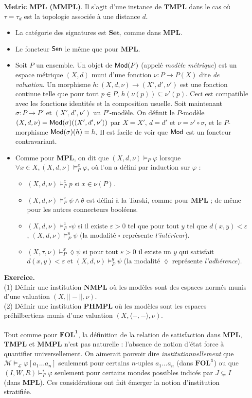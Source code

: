 \documentclass[11pt,a4paper]{article}
\newcommand{\La}{\mathcal{L}}
\newcommand{\M}{\mathcal{M}}
\newcommand{\ph}{\varphi}
\newcommand{\itemz}{\item[$\triangleright$]}
\newcommand{\gr}{\textbf}
\newcommand{\il}{\textit}
\newcommand{\info}[1]{\text{{\fontfamily{lmss}\selectfont #1}}}
\newcommand{\Mod}{\info{Mod}}
\newcommand{\Sen}{\info{Sen}}
\newcommand{\1}{\mathbbm{1}}
\begin{document}
\gr{Metric MPL (MMPL)}. Il s'agit d'une instance de $\gr{TMPL}$ dans le cas où $\tau = \tau_d$ est la topologie associée à une distance $d$.
\begin{itemize}
\itemz La catégorie des signatures est $\gr{Set}$, comme dans $\gr{MPL}$.
\itemz Le foncteur $\Sen$ le même que pour $\gr{MPL}$.
\itemz Soit $P$ un ensemble. Un objet de $\Mod(P)$ (appelé \il{modèle métrique}) est un espace métrique $(X,d)$ muni d'une fonction $\nu : P \to P(X)$ dite \il{de valuation}. Un morphisme $h : (X,d,\nu) \to (X',d',\nu')$ est une fonction continue telle que pour tout $p \in P$, $h(\nu(p)) \subseteq \nu'(p)$. Ceci est compatible avec les fonctions identités et la composition usuelle. Soit maintenant $\sigma : P \to P'$ et $(X',d',\nu')$ un $P'$-modèle. On définit le $P$-modèle $(X,d,\nu) = \Mod(\sigma)((X',d',\nu'))$ par $X = X'$, $d = d'$ et $\nu = \nu' \circ \sigma$, et le $P$-morphisme $\Mod(\sigma)(h) = h$. Il est facile de voir que $\Mod$ est un foncteur contravariant.
\itemz Comme pour $\gr{MPL}$, on dit que $(X,d,\nu) \models_P \ph$ lorsque $\forall x \in X, (X,d,\nu) \models_P^x \ph$, où l'on a défini par induction sur $\ph$ :
\begin{itemize}
\setlength\itemsep{-0.3em}
\item $(X,d,\nu) \models_P^x p$ si $x \in \nu(P)$.
\item $(X,d,\nu) \models_P^x \psi \wedge \theta$ est défini à la Tarski, comme pour $\gr{MPL}$ ; de même pour les autres connecteurs booléens.
\item $(X,d,\nu) \models_P^x \square \psi$ si il existe $\varepsilon > 0$ tel que pour tout $y$ tel que $d(x,y) < \varepsilon$, $(X,d,\nu) \models_P^y \psi$ (la modalité $\square$ représente \il{l'intérieur}).
\item $(X,\tau,\nu) \models_P^x \lozenge \psi$ si pour tout $\varepsilon > 0$ il existe un $y$ qui satisfait $d(x,y) < \varepsilon$ et $(X,d,\nu) \models_P^y \psi$ (la modalité $\lozenge$ représente \il{l'adhérence}).
\end{itemize}
\end{itemize}
\gr{Exercice.} \\ (1) Définir une institution $\gr{NMPL}$ où les modèles sont des espaces normés munis d'une valuation $(X,||-||,\nu)$. \\ (2) Définir une institution $\gr{PHMPL}$ où les modèles sont les espaces préhilbertiens munis d'une valuation $(X,\langle -, - \rangle, \nu)$. \\\\
Tout comme pour $\gr{FOL}^\gr{1}$, la définition de la relation de satisfaction dans $\gr{MPL}$, $\gr{TMPL}$ et $\gr{MMPL}$ n'est pas naturelle : l'absence de notion d'état force à quantifier universellement. On aimerait pouvoir dire \il{institutionnellement} que $\M \models_{\La} \ph[a_1...a_n]$ seulement pour certains $n$-uples $a_1...a_n$ (dans $\gr{FOL}^\gr{1}$) ou que $(I,W,R) \models_P^i \ph$ seulement pour certains mondes possibles indicés par $J \subsetneq I$ (dans $\gr{MPL}$). Ces considérations ont fait émerger la notion d'institution stratifiée.
\newpage
\end{document}
